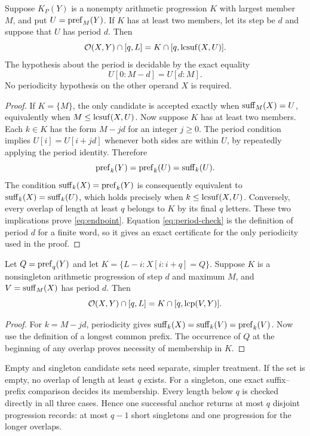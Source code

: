 \begin{theorem}
\label{thm:endpoint}
Suppose $K_P(Y)$ is a nonempty arithmetic progression $K$ with largest
member $M$, and put $U=\operatorname{pref}_M(Y)$. If $K$ has at least two members,
let its step be $d$ and suppose that $U$ has period $d$. Then
\begin{equation}
 \mathcal O(X,Y)\cap[q,L]
   =K\cap[q,\operatorname{lcsuf}(X,U)].
 \label{eq:endpoint}
\end{equation}
The hypothesis about the period is decidable by the exact equality
\begin{equation}
 U[0:M-d]=U[d:M].\label{eq:period-check}
\end{equation}
No periodicity hypothesis on the other operand $X$ is required.
\end{theorem}
\begin{proof}
If $K=\{M\}$, the only candidate is accepted exactly when
$\operatorname{suff}_M(X)=U$, equivalently when $M\leq\operatorname{lcsuf}(X,U)$.
Now suppose $K$ has at least two members.
Each $k\in K$ has the form $M-jd$ for an integer $j\geq0$.
The period condition implies $U[i]=U[i+jd]$ whenever both sides are within
$U$, by repeatedly applying the period identity. Therefore
\[
 \operatorname{pref}_k(Y)=\operatorname{pref}_k(U)=\operatorname{suff}_k(U).
\]
The condition $\operatorname{suff}_k(X)=\operatorname{pref}_k(Y)$ is consequently equivalent to
$\operatorname{suff}_k(X)=\operatorname{suff}_k(U)$, which holds precisely when
$k\leq\operatorname{lcsuf}(X,U)$. Conversely, every overlap of length at least $q$
belongs to $K$ by its final $q$ letters. These two implications prove \eqref{eq:endpoint}.
Equation \eqref{eq:period-check} is the definition of period $d$ for a finite word, so it gives
an exact certificate for the only periodicity used in the proof.
\end{proof}

\begin{corollary}
\label{cor:endpoint-symmetric}
Let $Q=\operatorname{pref}_q(Y)$ and let
$K=\{L-i:X[i:i+q]=Q\}$. Suppose $K$ is a nonsingleton arithmetic
progression of step $d$ and maximum $M$, and $V=\operatorname{suff}_M(X)$ has period $d$.
Then
\[
 \mathcal O(X,Y)\cap[q,L]=K\cap[q,\operatorname{lcp}(V,Y)].
\]
\end{corollary}
\begin{proof}
For $k=M-jd$, periodicity gives
$\operatorname{suff}_k(X)=\operatorname{suff}_k(V)=\operatorname{pref}_k(V)$. Now use the definition of a longest
common prefix. The occurrence of $Q$ at the beginning of any overlap proves
necessity of membership in $K$.
\end{proof}

Empty and singleton candidate sets need separate, simpler treatment. If the
set is empty, no overlap of length at least $q$ exists. For a singleton,
one exact suffix--prefix comparison decides its membership. Every length
below $q$ is checked directly in all three cases. Hence one successful
anchor returns at most $q$ disjoint progression records: at most $q-1$
short singletons and one progression for the longer overlaps.

